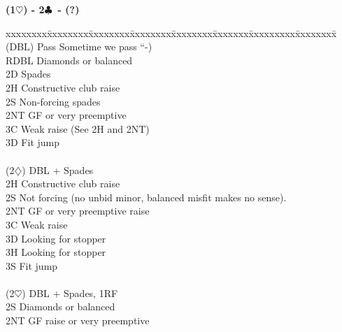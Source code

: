 \documentclass[10pt]{article}
\renewcommand{\c}{$\clubsuit$}
\renewcommand{\d}{$\diamondsuit$}
\newcommand{\h}{$\heartsuit$}
\newcommand{\x}{DBL}
\newenvironment{bidtable}[1][]
{\textbf{#1}
  \begin{adjustwidth}{1em}{}
    \addvspace{2pt}
    \begin{tabbing}
      xxxxxxxx\=xxxxxxxx\=xxxxxxxx\=xxxxxxxx\=xxxxxxxx\=xxxxxxx\=xxxxxxxxx\=xxxxxxxx\=\kill}
{\end{tabbing}\end{adjustwidth}\bigskip}%
\begin{document}
\begin{bidtable}[(1\h) - 2\c\ - (?)]
(\x)  \> Pass \> Sometime we pass “-)                                          \\
      \> RDBL \> Diamonds or balanced                                          \\
      \> 2D   \> Spades                                                        \\
      \> 2H   \> Constructive club raise                                       \\
      \> 2S   \> Non-forcing spades                                            \\
      \> 2NT  \> GF or very preemptive                                         \\
      \> 3C   \> Weak raise (See 2H and 2NT)                                   \\
      \> 3D   \> Fit jump                                                      \\
                                                                               \\
(2\d) \> DBL  + Spades                                                     \\
      \> 2H   \> Constructive club raise                                       \\
      \> 2S   \> Not forcing (no unbid minor, balanced misfit makes no sense). \\
      \> 2NT  \> GF or very preemptive raise                                   \\
      \> 3C   \> Weak raise                                                    \\
      \> 3D   \> Looking for stopper                                           \\
      \> 3H   \> Looking for stopper                                           \\
      \> 3S   \> Fit jump                                                      \\
                                                                               \\
(2\h) \> DBL  + Spades, 1RF                                                \\
      \> 2S   \> Diamonds or balanced                                          \\
      \> 2NT  \> GF raise or very preemptive                                   \\

\end{bidtable}
\end{document}
